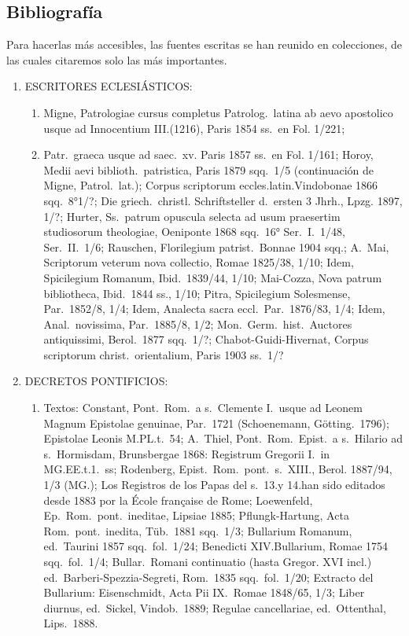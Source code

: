 \raggedbottom{} \documentclass[12pt, a4paper]{book}
\begin{document}
\subsection{Bibliografía} Para hacerlas más accesibles, las fuentes escritas se han reunido en
colecciones, de las cuales citaremos solo las más importantes.
\begin{enumerate}
  \item ESCRITORES ECLESIÁSTICOS:\@ \begin{enumerate}
          \item Migne, Patrologiae cursus completus Patrolog.\ latina ab aevo apostolico usque ad Innocentium III.\@ (1216), Paris 1854 ss.\ en Fol. 1/221;
          \item Patr.\ graeca usque ad saec.\ xv. Paris 1857 ss.\ en Fol. 1/161; Horoy, Medii aevi biblioth.\ patristica, Paris 1879 sqq.\ 1/5 (continuación de Migne, Patrol.\ lat.\@); Corpus scriptorum eccles.\@ latin.\@ Vindobonae 1866 sqq.\ 8°1/?; Die griech.\ christl. Schriftsteller d.\ ersten 3 Jhrh., Lpzg. 1897, 1/?; Hurter, Ss.\ patrum opuscula selecta ad usum praesertim studiosorum theologiae, Oeniponte 1868 sqq.\ 16° Ser.\ I.\ 1/48, Ser.\ II.\ 1/6; Rauschen, Florilegium patrist.\ Bonnae 1904 sqq.; A.\ Mai, Scriptorum veterum nova collectio, Romae 1825/38, 1/10; Idem, Spicilegium Romanum, Ibid.\ 1839/44, 1/10; Mai-Cozza, Nova patrum bibliotheca, Ibid.\ 1844 ss., 1/10; Pitra, Spicilegium Solesmense, Par.\ 1852/8, 1/4; Idem, Analecta sacra eccl.\ Par.\ 1876/83, 1/4; Idem, Anal.\ novissima, Par.\ 1885/8, 1/2; Mon.\ Germ.\ hist.\ Auctores antiquissimi, Berol.\ 1877 sqq.\ 1/?; Chabot-Guidi-Hivernat, Corpus scriptorum christ.\ orientalium, Paris 1903 ss.\ 1/?
        \end{enumerate}
  \item DECRETOS PONTIFICIOS:\@ \begin{enumerate}
          \item Textos: Constant, Pont.\ Rom.\ a s.\ Clemente I.\ usque ad Leonem Magnum Epistolae genuinae, Par.\ 1721 (Schoenemann, Götting.\ 1796); Epistolae Leonis M.\@ PL.\@ t.\ 54; A.\ Thiel, Pont.\ Rom.\ Epist.\ a s.\ Hilario ad s.\ Hormisdam, Brunsbergae 1868: Registrum Gregorii I.\ in MG.\@ EE.\@ t.\@ 1.\ ss; Rodenberg, Epist.\ Rom.\ pont.\ s.\ XIII., Berol. 1887/94, 1/3 (MG.); Los Registros de los Papas del s.\ 13.\@ y 14.\@ han sido editados desde 1883 por la École française de Rome; Loewenfeld, Ep.\ Rom.\ pont.\ ineditae, Lipsiae 1885; Pflungk-Hartung, Acta Rom.\ pont.\ inedita, Tüb.\ 1881 sqq.\ 1/3; Bullarium Romanum, ed.\ Taurini 1857 sqq.\ fol.\ 1/24; Benedicti XIV.\@ Bullarium, Romae 1754 sqq.\ fol.\ 1/4; Bullar.\ Romani continuatio (hasta Gregor. XVI incl.) ed.\ Barberi-Spezzia-Segreti, Rom.\ 1835 sqq.\ fol.\ 1/20; Extracto del Bullarium: Eisenschmidt, Acta Pii IX.\ Romae 1848/65, 1/3; Liber diurnus, ed.\ Sickel, Vindob.\ 1889; Regulae cancellariae, ed.\ Ottenthal, Lips.\ 1888.

\end{enumerate}
\end{enumerate}
\end{document}
